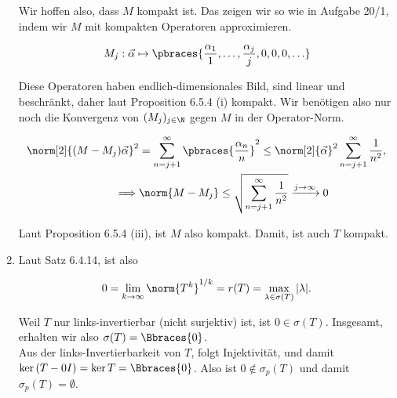 \begin{solution}
\begin{enumerate}[label = (\alph*)]
  Wir hoffen also, dass $M$ kompakt ist.
  Das zeigen wir so wie in Aufgabe 20/1, indem wir
  $M$ mit kompakten Operatoren approximieren.

  \begin{align*}
    M_j:
    \vec \alpha
    \mapsto
    \pbraces
    {
      \frac{\alpha_1}{1},
      \ldots,
      \frac{\alpha_j}{j},
      0, 0, 0, \ldots
    }
  \end{align*}

  Diese Operatoren haben endlich-dimensionales Bild, sind linear und beschränkt, daher
  laut Proposition 6.5.4 (i) kompakt.
  Wir benötigen also nur noch die Konvergenz von $(M_j)_{j \in \N}$ gegen $M$ in der Operator-Norm.

  \begin{align*}
    \norm[2]{(M - M_j) \vec \alpha}^2
    & =
    \sum_{n = j+1}^\infty
    \pbraces
    {
      \frac{\alpha_n}{n}
    }^2
    \leq
    \norm[2]{\vec \alpha}^2
    \sum_{n = j+1}^\infty
    \frac{1}{n^2}, \\
    \implies &
    \norm{M - M_j}
    \leq
    \sqrt
    {
      \sum_{n = j+1}^\infty
      \frac{1}{n^2}
    }
    \xrightarrow{j \to \infty} 0
  \end{align*}

  Laut Proposition 6.5.4 (iii), ist $M$ also kompakt.
  Damit, ist auch $T$ kompakt.

  \item
  \phantom{}


  Laut Satz 6.4.14, ist also

  \begin{align*}
    0
    =
    \lim_{k \to \infty} \norm{T^k}^{1/k}
    =
    r(T)
    =
    \max_{\lambda \in \sigma(T)} |\lambda|.
  \end{align*}

  Weil $T$ nur links-invertierbar (nicht surjektiv) ist, ist $0 \in \sigma(T)$.
  Insgesamt, erhalten wir also $\sigma(T) = \Bbraces{0}$. \\

  Aus der links-Invertierbarkeit von $T$, folgt Injektivität, und damit $\ker{(T - 0 I)} = \ker{T} = \Bbraces{0}$.
  Also ist $0 \notin \sigma_p(T)$ und damit $\sigma_p(T) = \emptyset$.

\end{enumerate}

\end{solution}
